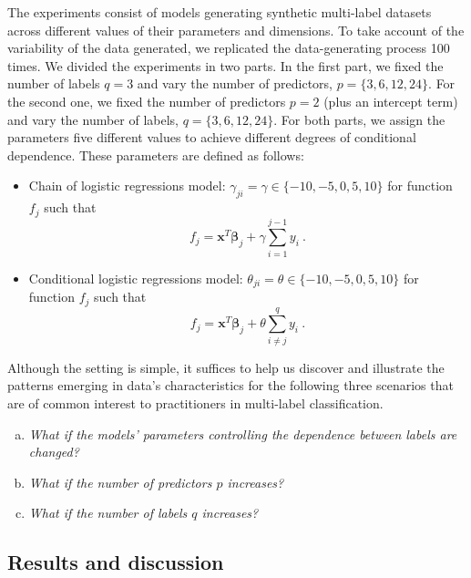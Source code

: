 \documentclass[review]{elsarticle}
\begin{document}
	The experiments consist of models generating synthetic multi-label datasets across different values of their parameters and dimensions. To take account of the variability of the data generated, we replicated the data-generating process 100 times. We divided the experiments in two parts. In the first part, we fixed the number of labels $q=3$ and vary the number of predictors, $p = \{ 3, 6, 12, 24\}$. For the second one, we fixed the number of predictors $p = 2$ (plus an intercept term) and vary the number of labels, $q = \{ 3, 6,12, 24\}$. For both parts, we assign the parameters five different values to achieve different degrees of conditional dependence. These parameters are defined as follows:
	\begin{itemize}
		\item Chain of logistic regressions model: $\gamma_{{j}i} = \gamma \in \{ -10, -5, 0, 5, 10 \}$ for function $f_{j}$ such that
		\begin{equation}\label{eq:param:gamma}
		f_{j} = \mathbf{x}^T\bm{\beta}_{j} + \gamma \sum_{i=1}^{j-1} y_{i}\ .
		\end{equation}
		\item Conditional logistic regressions model: $\theta_{ji} = \theta \in \{ -10, -5, 0, 5, 10\}$ for function $f_{j}$ such that
		\begin{equation}\label{eq:param:theta}
		f_{j} = \mathbf{x}^T \bm{\beta}_{j} + \theta \sum^{q}_{i \neq j}{y_{i}}\ .
		\end{equation}
	\end{itemize}
	
	Although the setting is simple, it suffices to help us discover and illustrate the patterns emerging in data's characteristics for the following three scenarios that are of common interest to practitioners in multi-label classification.
	\begin{enumerate}[(a)]
		\item \emph{What if the models' parameters controlling the dependence between labels are changed?} 
		\item  \emph{What if the number of predictors $p$ increases?} 
		\item \emph{What if the number of labels $q$ increases?} 
	\end{enumerate}
	
	
	\subsection{Results and discussion}
	
\end{document}
